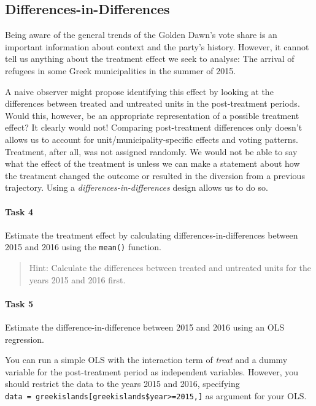 \documentclass[
]{article}
\begin{document}
\subsection{Differences-in-Differences}\label{differences-in-differences}

Being aware of the general trends of the Golden Dawn's vote share is an
important information about context and the party's history. However, it
cannot tell us anything about the treatment effect we seek to analyse:
The arrival of refugees in some Greek municipalities in the summer of
2015.

A naive observer might propose identifying this effect by looking at the
differences between treated and untreated units in the post-treatment
periods. Would this, however, be an appropriate representation of a
possible treatment effect? It clearly would not! Comparing
post-treatment differences only doesn't allows us to account for
unit/municipality-specific effects and voting patterns. Treatment, after
all, was not assigned randomly. We would not be able to say what the
effect of the treatment is unless we can make a statement about how the
treatment changed the outcome or resulted in the diversion from a
previous trajectory. Using a \emph{differences-in-differences} design
allows us to do so.

\paragraph{Task 4}\label{task-4}

Estimate the treatment effect by calculating differences-in-differences
between 2015 and 2016 using the \texttt{mean()} function.

\begin{quote}
Hint: Calculate the differences between treated and untreated units for
the years 2015 and 2016 first.
\end{quote}

\paragraph{Task 5}\label{task-5}

Estimate the difference-in-difference between 2015 and 2016 using an OLS
regression.

You can run a simple OLS with the interaction term of \emph{treat} and a
dummy variable for the post-treatment period as independent variables.
However, you should restrict the data to the years 2015 and 2016,
specifying
\texttt{data\ =\ greekislands{[}greekislands\$year\textgreater{}=2015,{]}}
as argument for your OLS.
\end{document}
